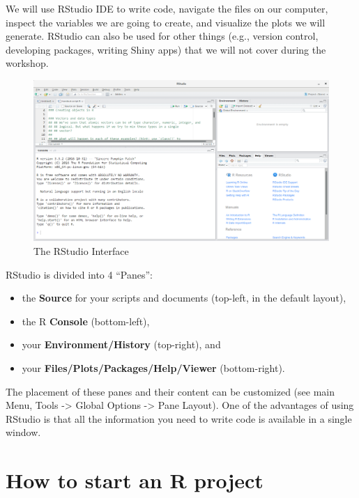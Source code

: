 \documentclass[
]{book}
\providecommand{\tightlist}{%
  \setlength{\itemsep}{0pt}\setlength{\parskip}{0pt}}
\begin{document}
We will use RStudio IDE to write code, navigate the files on our computer,
inspect the variables we are going to create, and visualize the plots we will
generate. RStudio can also be used for other things (e.g., version control,
developing packages, writing Shiny apps) that we will not cover during the
workshop.

\begin{figure}
\includegraphics[width=1\linewidth]{img/rstudio-screenshot} \caption{The RStudio Interface}\label{fig:RStudio-GUI}
\end{figure}

RStudio is divided into 4 ``Panes'':

\begin{itemize}
\tightlist
\item
  the \textbf{Source} for your scripts and documents
  (top-left, in the default layout),
\item
  the R \textbf{Console} (bottom-left),
\item
  your \textbf{Environment/History} (top-right), and
\item
  your \textbf{Files/Plots/Packages/Help/Viewer} (bottom-right).
\end{itemize}

The placement of these
panes and their content can be customized (see main Menu, Tools -\textgreater{} Global Options -\textgreater{}
Pane Layout). One of the advantages of using RStudio is that all the information
you need to write code is available in a single window.

\hypertarget{how-to-start-an-r-project}{%
\section{How to start an R project}\label{how-to-start-an-r-project}}
\end{document}
